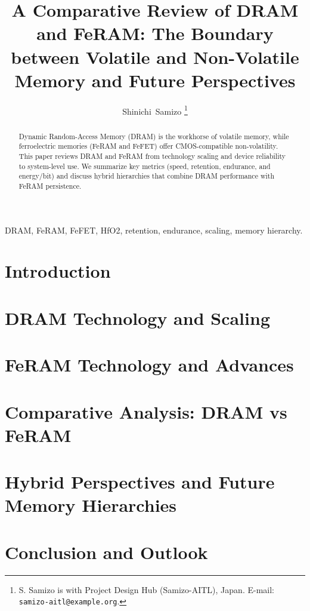 \documentclass[journal]{IEEEtran}
\title{A Comparative Review of DRAM and FeRAM: The Boundary between Volatile and Non-Volatile Memory and Future Perspectives}
\author{Shinichi~Samizo%
\thanks{S. Samizo is with Project Design Hub (Samizo-AITL), Japan. E-mail: \texttt{samizo-aitl@example.org}.}
}
\begin{document}
\maketitle

\begin{abstract}
Dynamic Random-Access Memory (DRAM) is the workhorse of volatile memory, while ferroelectric memories (FeRAM and FeFET) offer CMOS-compatible non-volatility. This paper reviews DRAM and FeRAM from technology scaling and device reliability to system-level use. We summarize key metrics (speed, retention, endurance, and energy/bit) and discuss hybrid hierarchies that combine DRAM performance with FeRAM persistence.
\end{abstract}

\begin{IEEEkeywords}
DRAM, FeRAM, FeFET, HfO2, retention, endurance, scaling, memory hierarchy.
\end{IEEEkeywords}

\section{Introduction}


\section{DRAM Technology and Scaling}


\section{FeRAM Technology and Advances}


\section{Comparative Analysis: DRAM vs FeRAM}
\label{sec:comparison}


\section{Hybrid Perspectives and Future Memory Hierarchies}


\section{Conclusion and Outlook}




\end{document}
